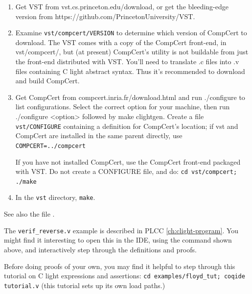 \documentclass[12pt,fleqn,openany,oneside,showtrims]{memoir}
\begin{document}
\begin{enumerate}\setlength\itemsep{0pt}
\item  Get VST from \textsf{vst.cs.princeton.edu/download},
or get the bleeding-edge version from 
\textsf{https://github.com/PrincetonUniversity/VST}.
\item Examine \lstinline{vst/compcert/VERSION} to determine which
version of CompCert to download.
The VST comes with a copy of the CompCert front-end, in vst/compcert/,
but (at present) CompCert's  utility is not buildable
from just the front-end distributed with VST.  You'll need 
to translate .c files into .v files containing C light abstract syntax.
Thus it's recommended to download
and build CompCert.

\item Get CompCert from \textsf{compcert.inria.fr/download.html}
and run \textsf{./configure} to list configurations. Select the correct option
for your machine, then run \textsf{./configure <option>} followed by \newline
\textsf{make clightgen}.
Create a file \lstinline{vst/CONFIGURE} containing a definition for CompCert's location;
if vst and CompCert are installed in the same
parent directly, use \lstinline{COMPCERT=../compcert}

If you have  not installed CompCert,
use the CompCert front-end packaged with VST.
Do not create a CONFIGURE file, and do:\newline
\lstinline{cd vst/compcert; ./make}  

\item In the \lstinline{vst} directory, \lstinline{make}.
\end{enumerate}
See also the file .


The \lstinline{verif_reverse.v} example is described
in PLCC \autoref{ch:clight-program}.
You might find it interesting to open this in the IDE,
using the command shown above,
and interactively step through the definitions and proofs.

Before doing proofs of your own, you may find it helpful
to step through this tutorial on C light expressions and
assertions:\newline
\lstinline{cd examples/floyd_tut; coqide tutorial.v}\newline
(this tutorial sets up its own load paths.)
\end{document}

